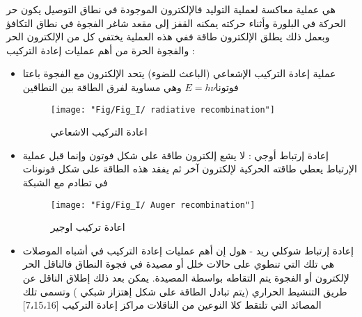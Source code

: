 	
	هي عملية معاكسة لعملية التوليد فالإلكترون  الموجودة في نطاق التوصيل يكون  حر الحركة  في البلورة وأثناء حركته يمكنه القفز إلى مقعد شاغر الفجوة  في نطاق التكافؤ  وبعمل ذلك  يطلق الإلكترون طاقة ففي هذه العملية يختفي كل من الإلكترون الحر والفجوة الحرة 
	من أهم عمليات إعادة التركيب :
	\begin {itemize}
	\item عملية إعادة التركيب الإشعاعي (الباعث للضوء) يتحد الإلكترون مع الفجوة باعتا فوتونا$ E=h\nu $  وهي مساوية لفرق الطاقة بين 
	النطاقين
	\begin{figure}[h!]
		\centering
		\texttt{[image: "Fig/Fig\_I/ radiative recombination"]}
		\caption{اعادة التركيب الاشعاعي}
		\label{fig:-radiative-recombination}
	\end{figure}
	\FloatBarrier
	\item إعادة إرتباط أوجي : لا يشع إلكترون طاقة على شكل فوتون  وإنما قبل عملية الإرتباط يعطي طاقته الحركية  لإلكترون آخر ثم يفقد هذه الطاقة على شكل فونونات في تطادم مع الشبكة 
	
	\begin{figure}[h!]
		\centering
		\texttt{[image: "Fig/Fig\_I/ Auger recombination"]}
		\caption{اعادة تركيب اوجير}
		\label{fig:-auger-recombination}
	\end{figure}
	\FloatBarrier
	
	\item  إعادة إرتباط شوكلي ريد - هول   إن أهم عمليات إعادة التركيب في أشباه الموصلات  هي تلك التي تنطوي على حالات خلل أو مصيدة في فجوة النطاق   فالناقل  الحر لإلكترون أو الفجوة يتم  التقاطه بواسطة المصيدة. يمكن بعد ذلك إطلاق الناقل عن طريق التنشيط الحراري (يتم تبادل الطاقة على شكل إهتزاز شبكي ) وتسمى تلك المصائد التي تلتقط  كلا النوعين من الناقلات  مراكز إعادة 
	التركيب
	[7،15،16]
	\end {itemize} 
	
	
	
